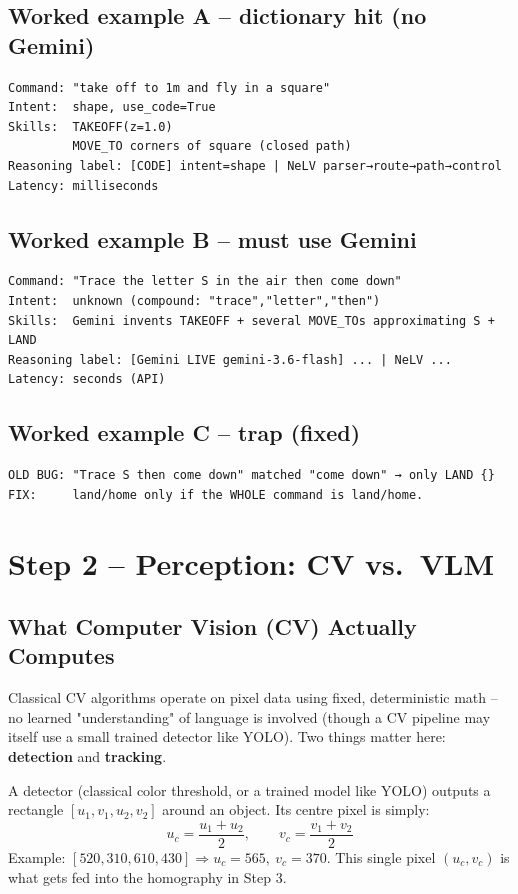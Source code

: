 \documentclass[11pt,a4paper]{article}
\begin{document}
\subsection*{Worked example A -- dictionary hit (no Gemini)}
\begin{verbatim}
Command: "take off to 1m and fly in a square"
Intent:  shape, use_code=True
Skills:  TAKEOFF(z=1.0)
         MOVE_TO corners of square (closed path)
Reasoning label: [CODE] intent=shape | NeLV parser→route→path→control
Latency: milliseconds
\end{verbatim}

\subsection*{Worked example B -- must use Gemini}
\begin{verbatim}
Command: "Trace the letter S in the air then come down"
Intent:  unknown (compound: "trace","letter","then")
Skills:  Gemini invents TAKEOFF + several MOVE_TOs approximating S + LAND
Reasoning label: [Gemini LIVE gemini-3.6-flash] ... | NeLV ...
Latency: seconds (API)
\end{verbatim}

\subsection*{Worked example C -- trap (fixed)}
\begin{verbatim}
OLD BUG: "Trace S then come down" matched "come down" → only LAND {}
FIX:     land/home only if the WHOLE command is land/home.
\end{verbatim}

\section{Step 2 -- Perception: CV vs.\ VLM}

\subsection{What Computer Vision (CV) Actually Computes}

Classical CV algorithms operate on pixel data using fixed, deterministic math -- no learned
"understanding" of language is involved (though a CV pipeline may itself use a small trained
detector like YOLO). Two things matter here: \textbf{detection} and \textbf{tracking}.

\begin{mathbox}[title={\textbf{Bounding-box center (used constantly)}}]
A detector (classical color threshold, or a trained model like YOLO) outputs a rectangle
$[u_1, v_1, u_2, v_2]$ around an object. Its centre pixel is simply:
\[
u_c = \frac{u_1+u_2}{2}, \qquad v_c = \frac{v_1+v_2}{2}
\]
Example: $[520, 310, 610, 430] \Rightarrow u_c = 565,\ v_c = 370$. This single pixel
$(u_c, v_c)$ is what gets fed into the homography in Step 3.
\end{mathbox}
\end{document}

